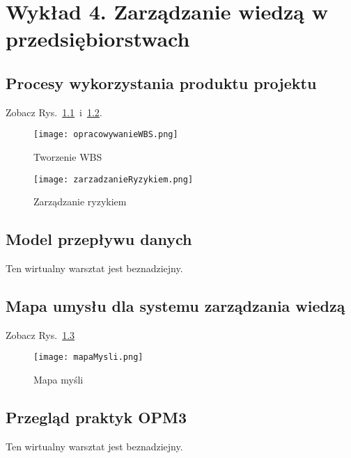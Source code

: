 \chapter{Wykład 4. Zarządzanie wiedzą w przedsiębiorstwach}

\section{Procesy wykorzystania produktu projektu}

Zobacz Rys.~\ref{fig:opracowanieWBS}~i~\ref{fig:zarzadzanieRyzykiem}.

\begin{figure}[hbt]
\centering
\texttt{[image: opracowywanieWBS.png]}
\caption{Tworzenie WBS}
\label{fig:opracowanieWBS}
\end{figure}

\begin{figure}[hbt]
\centering
\texttt{[image: zarzadzanieRyzykiem.png]}
\caption{Zarządzanie ryzykiem}
\label{fig:zarzadzanieRyzykiem}
\end{figure}


\section{Model przepływu danych}

Ten wirtualny warsztat jest beznadziejny.


\section{Mapa umysłu dla systemu zarządzania wiedzą}

Zobacz Rys.~\ref{fig:mapaMysli}

\begin{figure}[hbt]
\centering
\texttt{[image: mapaMysli.png]}
\caption{Mapa myśli}
\label{fig:mapaMysli}
\end{figure}


\section{Przegląd praktyk OPM3}

Ten wirtualny warsztat jest beznadziejny.


